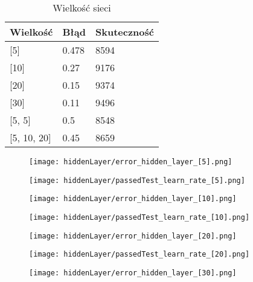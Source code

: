 \documentclass{article}
\begin{document}
\begin{table}[h]
  \centering
    
  \bgroup
  \def\arraystretch{1.3}
\begin{tabular}{|l|l|l|}
\hline
Wielkość & Błąd & Skuteczność \\ \hline
{[}5{]} & 0.478 & 8594 \\ \hline
{[}10{]} & 0.27 & 9176 \\ \hline
{[}20{]} & 0.15 & 9374 \\ \hline
{[}30{]} & 0.11 & 9496 \\ \hline
{[}5, 5{]} & 0.5 & 8548 \\ \hline
{[}5, 10, 20{]} & 0.45 & 8659 \\ \hline
\end{tabular}
  \egroup
  \vspace{10pt}
  \caption{Wielkość sieci}
\end{table}

\begin{figure}[]
  \centering
  \texttt{[image: hiddenLayer/error\_hidden\_layer\_[5].png]}
\end{figure}

\begin{figure}[]
  \centering
  \texttt{[image: hiddenLayer/passedTest\_learn\_rate\_[5].png]}
\end{figure}

\begin{figure}[]
  \centering
  \texttt{[image: hiddenLayer/error\_hidden\_layer\_[10].png]}
\end{figure}

\begin{figure}[]
  \centering
  \texttt{[image: hiddenLayer/passedTest\_learn\_rate\_[10].png]}
\end{figure}

\begin{figure}[]
  \centering
  \texttt{[image: hiddenLayer/error\_hidden\_layer\_[20].png]}
\end{figure}

\begin{figure}[]
  \centering
  \texttt{[image: hiddenLayer/passedTest\_learn\_rate\_[20].png]}
\end{figure}

\begin{figure}[]
  \centering
  \texttt{[image: hiddenLayer/error\_hidden\_layer\_[30].png]}
\end{figure}
\end{document}
